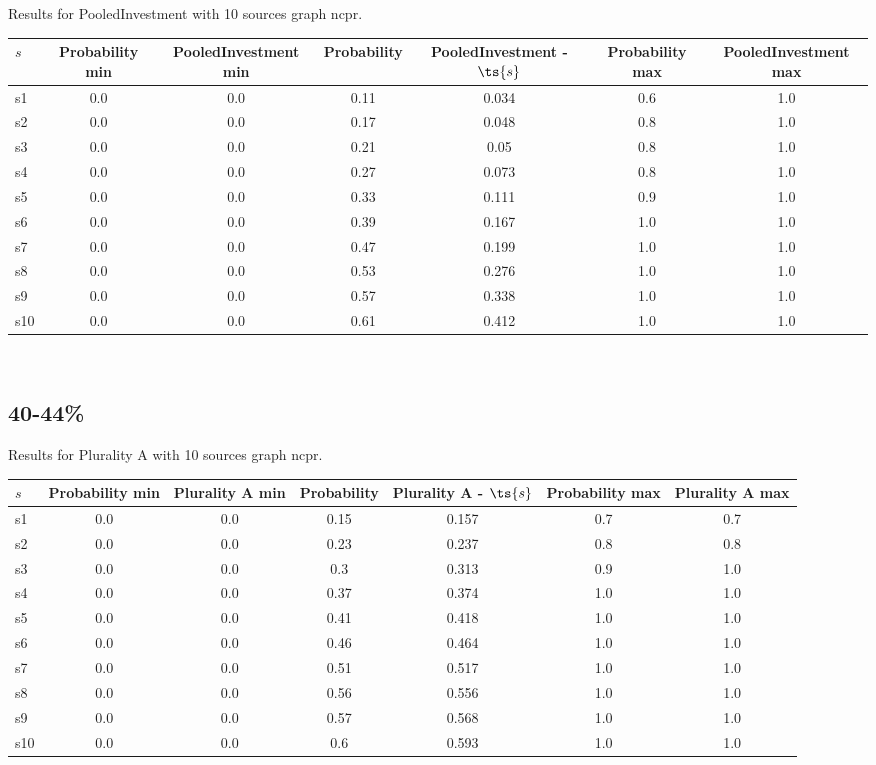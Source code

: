 \documentclass{article}
\begin{document}
\noindent Results for PooledInvestment with 10 sources graph ncpr.

\noindent\begin{tabular}{|l|c|c|c|c|c|c|}
\hline
$s$& Probability min & PooledInvestment min & Probability & PooledInvestment - $\ts{s}$ & Probability max & PooledInvestment max\\
\hline
s1 &0.0 & 0.0 & 0.11 & 0.034 & 0.6 & 1.0\\
\hline
s2 &0.0 & 0.0 & 0.17 & 0.048 & 0.8 & 1.0\\
\hline
s3 &0.0 & 0.0 & 0.21 & 0.05 & 0.8 & 1.0\\
\hline
s4 &0.0 & 0.0 & 0.27 & 0.073 & 0.8 & 1.0\\
\hline
s5 &0.0 & 0.0 & 0.33 & 0.111 & 0.9 & 1.0\\
\hline
s6 &0.0 & 0.0 & 0.39 & 0.167 & 1.0 & 1.0\\
\hline
s7 &0.0 & 0.0 & 0.47 & 0.199 & 1.0 & 1.0\\
\hline
s8 &0.0 & 0.0 & 0.53 & 0.276 & 1.0 & 1.0\\
\hline
s9 &0.0 & 0.0 & 0.57 & 0.338 & 1.0 & 1.0\\
\hline
s10 &0.0 & 0.0 & 0.61 & 0.412 & 1.0 & 1.0\\
\hline
\end{tabular}\\

\newpage

\subsection{40-44\%}

\noindent Results for Plurality A with 10 sources graph ncpr.

\noindent\begin{tabular}{|l|c|c|c|c|c|c|}
\hline
$s$& Probability min & Plurality A min & Probability & Plurality A - $\ts{s}$ & Probability max & Plurality A max\\
\hline
s1 &0.0 & 0.0 & 0.15 & 0.157 & 0.7 & 0.7\\
\hline
s2 &0.0 & 0.0 & 0.23 & 0.237 & 0.8 & 0.8\\
\hline
s3 &0.0 & 0.0 & 0.3 & 0.313 & 0.9 & 1.0\\
\hline
s4 &0.0 & 0.0 & 0.37 & 0.374 & 1.0 & 1.0\\
\hline
s5 &0.0 & 0.0 & 0.41 & 0.418 & 1.0 & 1.0\\
\hline
s6 &0.0 & 0.0 & 0.46 & 0.464 & 1.0 & 1.0\\
\hline
s7 &0.0 & 0.0 & 0.51 & 0.517 & 1.0 & 1.0\\
\hline
s8 &0.0 & 0.0 & 0.56 & 0.556 & 1.0 & 1.0\\
\hline
s9 &0.0 & 0.0 & 0.57 & 0.568 & 1.0 & 1.0\\
\hline
s10 &0.0 & 0.0 & 0.6 & 0.593 & 1.0 & 1.0\\
\hline
\end{tabular}\\
\end{document}
